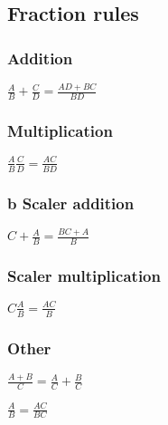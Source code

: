 \subsection{Fraction rules}

\subsubsection{Addition}

\(\frac{A}{B}+\frac{C}{D}=\frac{AD+BC}{BD}\)

\subsubsection{Multiplication}

\(\frac{A}{B}\frac{C}{D}=\frac{AC}{BD}\)

\subsubsection{b Scaler addition}

\(C+\frac{A}{B}=\frac{BC+A}{B}\)

\subsubsection{Scaler multiplication}

\(C\frac{A}{B}=\frac{AC}{B}\)

\subsubsection{Other}

\(\frac{A+B}{C}=\frac{A}{C}+\frac{B}{C}\)

\(\frac{A}{B}=\frac{AC}{BC}\)

